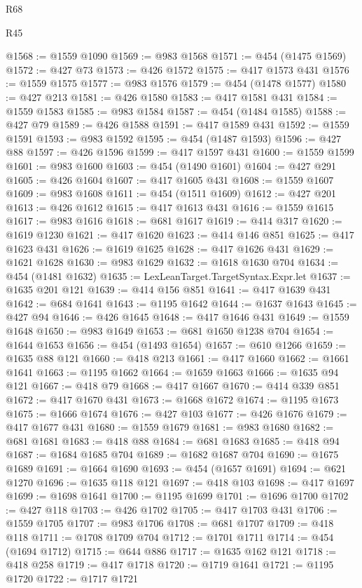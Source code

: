 \begin{lexlean}{R68}
\begin{lexlean}{R45}
\begin{coremodule}
{{{{{{{{{{{{{{{{{{{{{{{{{{{{{{{{{{{{{{{{{{{{{{{{{{{{{{{{{{{{{{{{{{{{{{{{{{{{{{{{{{{{{{{{{{{@1568 := @1559 @1090
@1569 := @983 @1568
@1571 := @454 (@1475 @1569)
@1572 := @427 @73
@1573 := @426 @1572
@1575 := @417 @1573 @431
@1576 := @1559 @1575
@1577 := @983 @1576
@1579 := @454 (@1478 @1577)
@1580 := @427 @213
@1581 := @426 @1580
@1583 := @417 @1581 @431
@1584 := @1559 @1583
@1585 := @983 @1584
@1587 := @454 (@1484 @1585)
@1588 := @427 @79
@1589 := @426 @1588
@1591 := @417 @1589 @431
@1592 := @1559 @1591
@1593 := @983 @1592
@1595 := @454 (@1487 @1593)
@1596 := @427 @88
@1597 := @426 @1596
@1599 := @417 @1597 @431
@1600 := @1559 @1599
@1601 := @983 @1600
@1603 := @454 (@1490 @1601)
@1604 := @427 @291
@1605 := @426 @1604
@1607 := @417 @1605 @431
@1608 := @1559 @1607
@1609 := @983 @1608
@1611 := @454 (@1511 @1609)
@1612 := @427 @201
@1613 := @426 @1612
@1615 := @417 @1613 @431
@1616 := @1559 @1615
@1617 := @983 @1616
@1618 := @681 @1617
@1619 := @414 @317
@1620 := @1619 @1230
@1621 := @417 @1620
@1623 := @414 @146 @851
@1625 := @417 @1623 @431
@1626 := @1619 @1625
@1628 := @417 @1626 @431
@1629 := @1621 @1628
@1630 := @983 @1629
@1632 := @1618 @1630 @704
@1634 := @454 (@1481 @1632)
@1635 := LexLeanTarget.TargetSyntax.Expr.let
@1637 := @1635 @201 @121
@1639 := @414 @156 @851
@1641 := @417 @1639 @431
@1642 := @684 @1641
@1643 := @1195 @1642
@1644 := @1637 @1643
@1645 := @427 @94
@1646 := @426 @1645
@1648 := @417 @1646 @431
@1649 := @1559 @1648
@1650 := @983 @1649
@1653 := @681 @1650 @1238 @704
@1654 := @1644 @1653
@1656 := @454 (@1493 @1654)
@1657 := @610 @1266
@1659 := @1635 @88 @121
@1660 := @418 @213
@1661 := @417 @1660
@1662 := @1661 @1641
@1663 := @1195 @1662
@1664 := @1659 @1663
@1666 := @1635 @94 @121
@1667 := @418 @79
@1668 := @417 @1667
@1670 := @414 @339 @851
@1672 := @417 @1670 @431
@1673 := @1668 @1672
@1674 := @1195 @1673
@1675 := @1666 @1674
@1676 := @427 @103
@1677 := @426 @1676
@1679 := @417 @1677 @431
@1680 := @1559 @1679
@1681 := @983 @1680
@1682 := @681 @1681
@1683 := @418 @88
@1684 := @681 @1683
@1685 := @418 @94
@1687 := @1684 @1685 @704
@1689 := @1682 @1687 @704
@1690 := @1675 @1689
@1691 := @1664 @1690
@1693 := @454 (@1657 @1691)
@1694 := @621 @1270
@1696 := @1635 @118 @121
@1697 := @418 @103
@1698 := @417 @1697
@1699 := @1698 @1641
@1700 := @1195 @1699
@1701 := @1696 @1700
@1702 := @427 @118
@1703 := @426 @1702
@1705 := @417 @1703 @431
@1706 := @1559 @1705
@1707 := @983 @1706
@1708 := @681 @1707
@1709 := @418 @118
@1711 := @1708 @1709 @704
@1712 := @1701 @1711
@1714 := @454 (@1694 @1712)
@1715 := @644 @886
@1717 := @1635 @162 @121
@1718 := @418 @258
@1719 := @417 @1718
@1720 := @1719 @1641
@1721 := @1195 @1720
@1722 := @1717 @1721
}}}}}}}}}}}}}}}}}}}}}}}}}}}}}}}}}}}}}}}}}}}}}}}}}}}}}}}}}}}}}}}}}}}}}}}}}}}}}}}}}}}}}}}}}}}
\end{coremodule}
\end{lexlean}
\end{lexlean}
